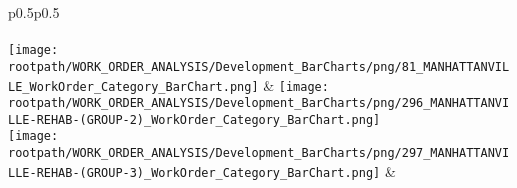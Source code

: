 \begin{center}
                                \tablehead{\hspace{1cm}\\}
                                \tabletail{\hspace{1cm}\\}
                                \begin{supertabular}{p{0.5\textwidth}p{0.5\textwidth}}
                                 \\
                                 \\
                                \texttt{[image: \\rootpath/WORK\_ORDER\_ANALYSIS/Development\_BarCharts/png/81\_MANHATTANVILLE\_WorkOrder\_Category\_BarChart.png]} & \texttt{[image: \\rootpath/WORK\_ORDER\_ANALYSIS/Development\_BarCharts/png/296\_MANHATTANVILLE-REHAB-(GROUP-2)\_WorkOrder\_Category\_BarChart.png]} \\
                                        \texttt{[image: \\rootpath/WORK\_ORDER\_ANALYSIS/Development\_BarCharts/png/297\_MANHATTANVILLE-REHAB-(GROUP-3)\_WorkOrder\_Category\_BarChart.png]} &  \hspace{1cm} \\
                                        \end{supertabular}
\end{center}

